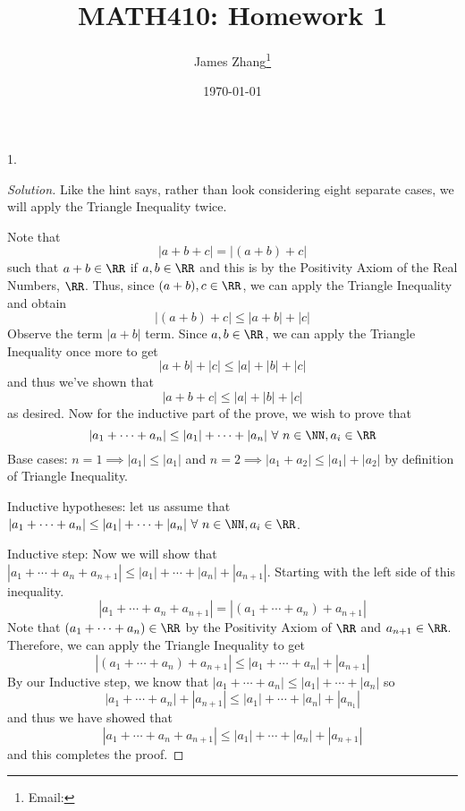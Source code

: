 \documentclass[12pt]{scrartcl}
\begin{document}
\title{MATH410: Homework 1}
\author{James Zhang\thanks{Email: }}
\date{\today}



\maketitle

1. \begin{proof}[Solution]
  Like the hint says, rather than look considering eight
  separate cases, we will apply the Triangle Inequality twice.

  Note that 
  \[|a + b + c| = |(a + b) + c|\]
  such that $a + b \in \RR$ if $a, b \in \RR$ and this is 
  by the Positivity Axiom of the Real Numbers, $\RR$. 
  Thus, since $(a + b), c \in \RR$, we can apply the Triangle Inequality
  and obtain 
  \[|(a + b) + c| \leq |a + b| + |c|\]
  Observe the term $|a + b|$ term. Since $a, b \in \RR$, we can apply 
  the Triangle Inequality once more to get 
  \[|a + b| + |c| \leq |a| + |b| + |c|\]
  and thus we've shown that
  \[|a + b + c| \leq |a| + |b| + |c|\]
  as desired. Now for the inductive part of the prove, we wish to prove that 
  \[|a_1 + \cdots + a_n| \leq |a_1| + \cdots + |a_n| \ \forall \ n \in \NN, a_i \in \RR\] 
  Base cases: $n = 1 \implies |a_1| \leq |a_1|$ and $n = 2 \implies |a_1 + a_2| \leq |a_1| + |a_2|$ by definition of Triangle 
  Inequality.

  Inductive hypotheses: let us assume that 
  $|a_1 + \cdots + a_n| \leq |a_1| + \cdots + |a_n| \ \forall \ n \in \NN, a_i \in \RR$.

  Inductive step: Now we will show that $|a_1 + \cdots + a_n + a_{n+1}| \leq |a_1| + \cdots + |a_n| + |a_{n+1}|$.
  Starting with the left side of this inequality.
  \[|a_1 + \cdots + a_n + a_{n+1}| = |(a_1 + \cdots + a_n) + a_{n+1}|\]
  Note that $(a_1 + \cdots + a_n) \in \RR$ by the Positivity Axiom of $\RR$ and $a_{n+1} \in \RR$. Therefore, 
  we can apply the Triangle Inequality to get 
  \[|(a_1 + \cdots + a_n) + a_{n+1}| \leq |a_1 + \cdots + a_n| + |a_{n+1}|\] 
  By our Inductive step, we know that $|a_1 + \cdots + a_n| \leq |a_1| + \cdots + |a_n|$ so 
  \[|a_1 + \cdots + a_n| + |a_{n+1}| \leq |a_1| + \cdots + |a_n| + |a_{n_1}|\]
  and thus we have showed that 
  \[|a_1 + \cdots + a_n + a_{n+1}| \leq |a_1| + \cdots + |a_n| + |a_{n+1}|\]
  and this completes the proof.
\end{proof}
\end{document}

